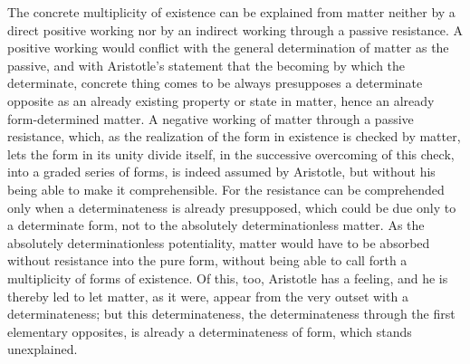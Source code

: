 The concrete multiplicity of existence can be explained from matter
neither by a direct positive working nor by an indirect working through a
passive resistance. A positive working would conflict with the general
determination of matter as the passive, and with Aristotle's statement
that the becoming by which the determinate, concrete thing comes to be
always presupposes a determinate opposite as an already
existing property or state in matter, hence an already form-determined
matter. A negative working of matter through a passive resistance, which,
as the realization of the form in existence is checked by matter, lets
the form in its unity divide itself, in the successive overcoming of this
check, into a graded series of forms, is indeed assumed by Aristotle, but
without his being able to make it comprehensible. For the resistance can
be comprehended only when a determinateness is already presupposed, which
could be due only to a determinate form, not to the absolutely
determinationless matter. As the absolutely determinationless
potentiality, matter would have to be absorbed without resistance into
the pure form, without being able to call forth a multiplicity of forms
of existence. Of this, too, Aristotle has a feeling, and he is thereby
led to let matter, as it were, appear from the very outset with a
determinateness; but this determinateness, the determinateness through
the first elementary opposites, is already a determinateness of form,
which stands unexplained.

